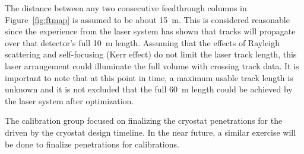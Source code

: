 The distance between any two consecutive feedthrough columns in Figure~\ref{fig:ftmap} is assumed to be about \SI{15}{\m}. This is considered %
reasonable since the experience from the \microboone laser system has shown that tracks will propagate over %
that detector's full \SI{10}{\m} length. %
Assuming that the effects of Rayleigh scattering and self-focusing (Kerr effect) do not limit the laser track length, %
this laser arrangement could illuminate the full volume with crossing track data. 
It is important to note that at this point in time, a maximum usable track length is unknown and it is not excluded that the full \SI{60}{\m} \detmodule length could be achieved by the laser system after optimization.

The calibration group focused on finalizing the cryostat penetrations for the \spmod driven by the cryostat design timeline. In the near future, a similar exercise will be done to finalize \dpmod %
penetrations for calibrations.

